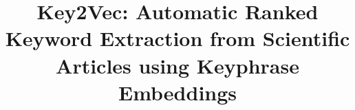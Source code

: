 \documentclass[conference]{IEEEtran}
\begin{document}
%
\title{Key2Vec: Automatic Ranked Keyword Extraction from Scientific Articles using Keyphrase Embeddings}


\author{
\and
{}
}


% 








\maketitle
\end{document}
